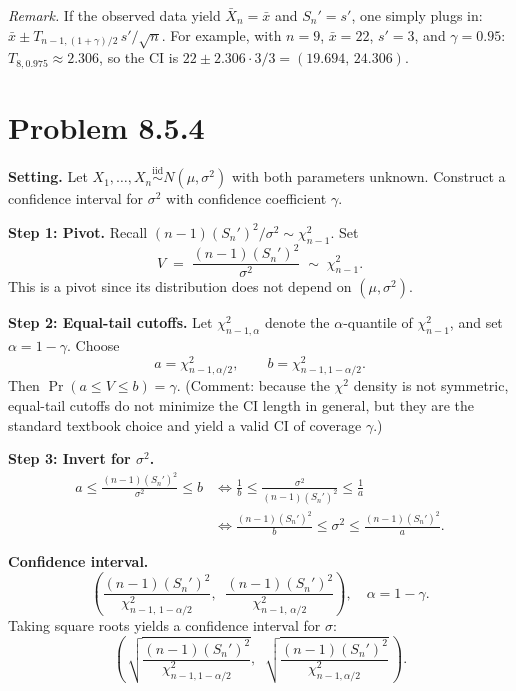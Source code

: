 \documentclass[11pt]{article}
\newcommand{\iid}{\stackrel{\text{iid}}{\sim}}
\begin{document}
\medskip
\textit{Remark.} If the observed data yield $\bar X_n=\bar x$ and $S_n'=s'$, one simply plugs in:
$\bar x \pm T_{n-1,(1+\gamma)/2}\, s'/\sqrt{n}$. For example, with $n=9$, $\bar x=22$, $s'=3$, and $\gamma=0.95$: $T_{8,0.975}\approx 2.306$, so the CI is $22\pm 2.306\cdot 3/3 = (19.694,\,24.306)$.

\bigskip
\section*{Problem 8.5.4}
\textbf{Setting.} Let $X_1,\dots,X_n \iid N(\mu,\sigma^2)$ with both parameters unknown. Construct a confidence interval for $\sigma^2$ with confidence coefficient $\gamma$.

\textbf{Step 1: Pivot.} Recall $(n-1)(S_n')^2/\sigma^2 \sim \chi^2_{n-1}$. Set
\[
V \;=\; \frac{(n-1)(S_n')^2}{\sigma^2} \;\sim\; \chi^2_{n-1}.
\]
This is a pivot since its distribution does not depend on $(\mu,\sigma^2)$.

\textbf{Step 2: Equal-tail cutoffs.} Let $\chi^2_{n-1,\alpha}$ denote the $\alpha$-quantile of $\chi^2_{n-1}$, and set $\alpha=1-\gamma$. Choose
\[
a = \chi^2_{n-1,\alpha/2}, \qquad b = \chi^2_{n-1,1-\alpha/2}.
\]
Then $\Pr(a \le V \le b) = \gamma$. (Comment: because the $\chi^2$ density is not symmetric, equal-tail cutoffs do not minimize the CI length in general, but they are the standard textbook choice and yield a valid CI of coverage $\gamma$.)

\textbf{Step 3: Invert for $\sigma^2$.}
\begin{align*}
a \le \frac{(n-1)(S_n')^2}{\sigma^2} \le b
&\iff \frac{1}{b} \le \frac{\sigma^2}{(n-1)(S_n')^2} \le \frac{1}{a} \\
&\iff \frac{(n-1)(S_n')^2}{b} \le \sigma^2 \le \frac{(n-1)(S_n')^2}{a}.
\end{align*}

\textbf{Confidence interval.}
\begin{equation}\label{eq:CIvar}
\boxed{\;\;\left(\frac{(n-1)(S_n')^2}{\chi^2_{n-1,\,1-\alpha/2}},\;\; \frac{(n-1)(S_n')^2}{\chi^2_{n-1,\,\alpha/2}}\right),\quad \alpha = 1-\gamma.\;\;}
\end{equation}
Taking square roots yields a confidence interval for $\sigma$:
\[
\left(\,\sqrt{\frac{(n-1)(S_n')^2}{\chi^2_{n-1,1-\alpha/2}}},\;\;\sqrt{\frac{(n-1)(S_n')^2}{\chi^2_{n-1,\alpha/2}}}\,\right).
\]

\bigskip
\end{document}
